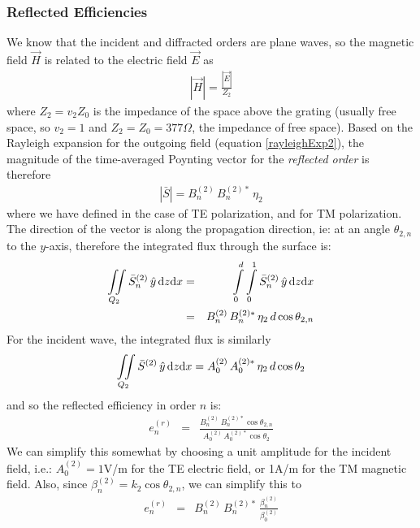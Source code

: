\subsubsection{Reflected Efficiencies}
We know that the incident and diffracted orders are plane waves, so the magnetic field $\vec H$ is related to the electric field $\vec E$ as
\begin{eqnarray}
\left| \vec H \right| = \frac{\left| \vec E \right|}{Z_2}
\end{eqnarray}
where $Z_2 = v_2 Z_0$ is the impedance of the space above the grating (usually free space, so $v_2=1$ and $Z_2 = Z_0 = 377\Omega$, the impedance of free space). Based on the Rayleigh expansion for the outgoing field (equation \ref{rayleighExp2}), the magnitude of the time-averaged Poynting vector for the \emph{reflected order} is therefore
\begin{eqnarray}
\left| \bar S \right| = B_n^{(2)} \, B_n^{(2)\ast} \, \eta_2
\end{eqnarray}
where we have defined  in the case of TE polarization, and  for TM polarization.  The direction of the vector is along the propagation direction, ie: at an angle $\theta_{2,n}$ to the $y$-axis, therefore the integrated flux through the surface is:
\begin{eqnarray}
\iint \limits_{Q_2} \bar S_n^{(2)} \, \hat y \, \mathrm{d} z \mathrm{d} x &=& \int \limits_0^d \int \limits_0^1 \bar S_n^{(2)} \, \hat y \, \mathrm{d} z \mathrm{d} x \\
&=& B_n^{(2)} \, B_n^{(2)\ast} \, \eta_2 \, d \cos \theta_{2,n} 
\end{eqnarray}
For the incident wave, the integrated flux is similarly 
\begin{eqnarray}
\iint \limits_{Q_2} \bar S^{(2)} \, \hat y \, \mathrm{d} z \mathrm{d} x = A_0^{(2)} \, A_0^{(2)\ast} \, \eta_2 \, d \cos \theta_{2} 
\end{eqnarray}
and so the reflected efficiency in order $n$ is:
\begin{eqnarray}
e_n^{(r)} &=& \frac{    B_n^{(2)} \, B_n^{(2)\ast} \cos \theta_{2,n}       }{    A_0^{(2)} \, A_0^{(2)\ast}  \cos \theta_{2}     }
\end{eqnarray}
We can simplify this somewhat by choosing a unit amplitude for the incident field, i.e.: $A_0^{(2)} = 1$V/m for the TE electric field, or 1A/m for the TM magnetic field. Also, since $\beta_n^{(2)} = k_2 \cos \theta_{2,n}$, we can simplify this to
\begin{eqnarray}
e_n^{(r)} &=& B_n^{(2)} \, B_n^{(2)\ast} \, \frac{     \beta_n^{(2)}       }{    \beta_0^{(2)}      }
\end{eqnarray}

